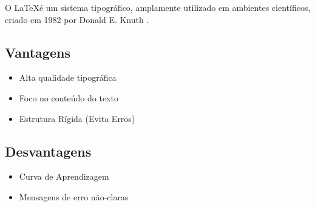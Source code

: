 \documentclass[12pt]{article}
\begin{document}
O \LaTeX é um sistema tipográfico, amplamente utilizado em ambientes científicos, criado em 1982 por Donald E. Knuth \cite{oetiker:98}.

\subsection{Vantagens}

\begin{itemize}
	\item Alta qualidade tipográfica
	\item Foco no conteúdo do texto
	\item Estrutura Rígida (Evita Erros)
\end{itemize}

\subsection{Desvantagens}

\begin{itemize}
	\item Curva de Aprendizagem
	\item Mensagens de erro não-claras
\end{itemize}




\end{document}
